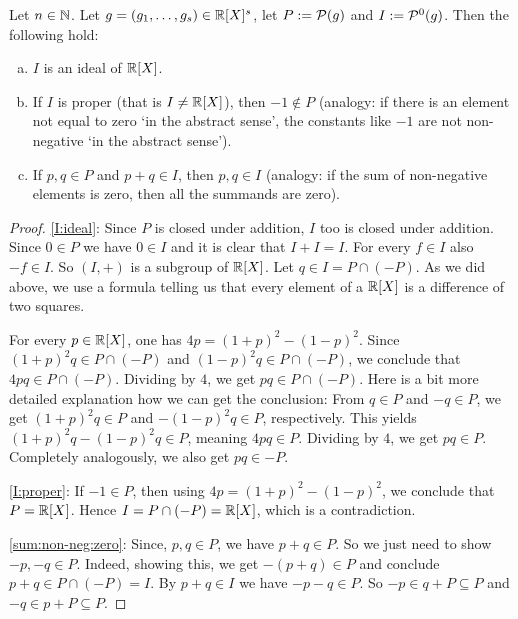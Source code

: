 \begin{lemma}
	\label{lem:ideals}
	Let $n \in \mathbb{N}$. Let $g=(g_1,\ldots,g_s) \in \mathbb{R}[X]^s$, let $P:=\mathcal{P}(g)$ and $I:=\mathcal{P}^0(g)$. Then the following hold: 
	\begin{enumerate}[(a)]
		\item \label{I:ideal} $I$ is an ideal of $\mathbb{R}[X]$.
		\item \label{I:proper} If $I$ is proper (that is $I \ne \mathbb{R}[X]$), then $-1 \not\in P$ (analogy: if there is an element not equal to zero `in the abstract sense', the constants like $-1$ are not non-negative `in the abstract sense').
		\item \label{sum:non-neg:zero} If $p, q \in P$ and $p+q \in I$, then $p, q \in I$ (analogy: if the sum of non-negative elements is zero, then all the summands are zero). 
	\end{enumerate}
\end{lemma}
\begin{proof}
 \eqref{I:ideal}: Since $P$ is closed under addition, $I$ too is closed under addition. Since $0 \in P$ we have $0 \in I$ and it is clear that $I + I = I$. For every $f \in I$ also $-f \in I$. So $(I,+)$ is a subgroup of $\mathbb{R}[X]$. Let $q \in I = P \cap (-P)$. As we did above, we use a formula telling us that every element of a $\mathbb{R}[X]$ is a difference of two squares.
 
 For every $p \in \mathbb{R}[X]$, one has $ 4 p = (1+p)^2 - (1-p)^2$. Since $(1+p)^2 q \in P \cap (-P)$ and $(1-p)^2 q \in P \cap (-P)$, we conclude that $4 p q \in P \cap (-P)$. Dividing by $4$, we get $p q \in P \cap (-P)$. Here is a bit more detailed explanation how we can get the conclusion: From $q \in P$ and $-q \in P$, we get $(1+p)^2 q \in P$ and $-(1-p)^2 q \in P$, respectively. This yields $(1+p)^2 q - (1-p)^2 q \in P$, meaning $4 p q \in P$. Dividing by $4$, we get $p q \in P$. Completely analogously, we also get $p q \in -P$. 
 
 \eqref{I:proper}: If $-1 \in P$, then using $ 4 p = (1+p)^2 - (1-p)^2$, we conclude that $P = \mathbb{R}[X]$. Hence $I=P \cap (-P) = \mathbb{R}[X]$, which is a contradiction. 
 
 \eqref{sum:non-neg:zero}: Since, $p,q \in P$, we have $p+q \in P$. So we just need to show $-p, -q \in P$. Indeed, showing this, we get $-(p+q) \in P$ and conclude $p+q \in P \cap (-P) = I$. By $p+q \in I$ we have $-p - q \in P$. So $-p \in q + P \subseteq P$ and $-q  \in p +P \subseteq P$. 
\end{proof}

